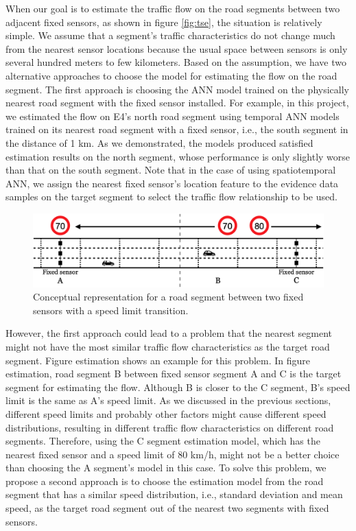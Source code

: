 \documentclass[english]{kththesis}
\begin{document}
When our goal is to estimate the traffic flow on the road segments between two adjacent fixed sensors, as shown in figure \ref{fig:tse}, the situation is relatively simple. We assume that a segment's traffic characteristics do not change much from the nearest sensor locations because the usual space between sensors is only several hundred meters to few kilometers. Based on the assumption, we have two alternative approaches to choose the model for estimating the flow on the road segment. The first approach is choosing the ANN model trained on the physically nearest road segment with the fixed sensor installed. For example, in this project, we estimated the flow on E4's north road segment using temporal ANN models trained on its nearest road segment with a fixed sensor, i.e., the south segment in the distance of 1 km. As we demonstrated, the models produced satisfied estimation results on the north segment, whose performance is only slightly worse than that on the south segment. Note that in the case of using spatiotemporal ANN, we assign the nearest fixed sensor's location feature to the evidence data samples on the target segment to select the traffic flow relationship to be used.

\begin{figure}[!ht]
    \centering
    \includegraphics[width=1.0\textwidth]{speed_limit_transition.png}
    \caption{Conceptual representation for a road segment between two fixed sensors with a speed limit transition.}
    \label{fig:speed_limit_transition}
\end{figure}

However, the first approach could lead to a problem that the nearest segment might not have the most similar traffic flow characteristics as the target road segment. Figure estimation shows an example for this problem. In figure estimation, road segment B between fixed sensor segment A and C is the target segment for estimating the flow. Although B is closer to the C segment, B's speed limit is the same as A's speed limit. As we discussed in the previous sections, different speed limits and probably other factors might cause different speed distributions, resulting in different traffic flow characteristics on different road segments. Therefore, using the C segment estimation model, which has the nearest fixed sensor and a speed limit of 80 km/h, might not be a better choice than choosing the A segment's model in this case. To solve this problem, we propose a second approach is to choose the estimation model from the road segment that has a similar speed distribution, i.e., standard deviation and mean speed, as the target road segment out of the nearest two segments with fixed sensors.
\end{document}
